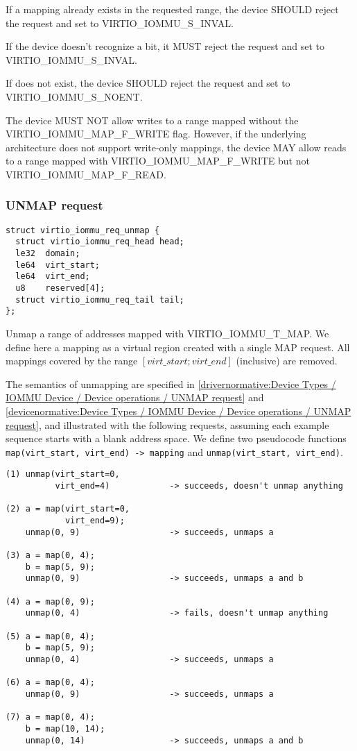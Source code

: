 If a mapping already exists in the requested range, the device SHOULD
reject the request and set  to VIRTIO_IOMMU_S_INVAL.

If the device doesn't recognize a  bit, it MUST reject the
request and set  to VIRTIO_IOMMU_S_INVAL.

If  does not exist, the device SHOULD reject the request and
set  to VIRTIO_IOMMU_S_NOENT.

The device MUST NOT allow writes to a range mapped without the
VIRTIO_IOMMU_MAP_F_WRITE flag. However, if the underlying architecture
does not support write-only mappings, the device MAY allow reads to a
range mapped with VIRTIO_IOMMU_MAP_F_WRITE but not
VIRTIO_IOMMU_MAP_F_READ.

\subsubsection{UNMAP request}\label{sec:Device Types / IOMMU Device / Device operations / UNMAP request}

\begin{lstlisting}
struct virtio_iommu_req_unmap {
  struct virtio_iommu_req_head head;
  le32  domain;
  le64  virt_start;
  le64  virt_end;
  u8    reserved[4];
  struct virtio_iommu_req_tail tail;
};
\end{lstlisting}

Unmap a range of addresses mapped with VIRTIO_IOMMU_T_MAP. We define here
a mapping as a virtual region created with a single MAP request. All
mappings covered by the range $[virt\_start; virt\_end]$ (inclusive) are
removed.

The semantics of unmapping are specified in \ref{drivernormative:Device
Types / IOMMU Device / Device operations / UNMAP request} and
\ref{devicenormative:Device Types / IOMMU Device / Device operations /
UNMAP request}, and illustrated with the following requests, assuming each
example sequence starts with a blank address space. We define two
pseudocode functions \texttt{map(virt_start, virt_end) -> mapping} and
\texttt{unmap(virt_start, virt_end)}.

\begin{lstlisting}
(1) unmap(virt_start=0,
          virt_end=4)            -> succeeds, doesn't unmap anything

(2) a = map(virt_start=0,
            virt_end=9);
    unmap(0, 9)                  -> succeeds, unmaps a

(3) a = map(0, 4);
    b = map(5, 9);
    unmap(0, 9)                  -> succeeds, unmaps a and b

(4) a = map(0, 9);
    unmap(0, 4)                  -> fails, doesn't unmap anything

(5) a = map(0, 4);
    b = map(5, 9);
    unmap(0, 4)                  -> succeeds, unmaps a

(6) a = map(0, 4);
    unmap(0, 9)                  -> succeeds, unmaps a

(7) a = map(0, 4);
    b = map(10, 14);
    unmap(0, 14)                 -> succeeds, unmaps a and b
\end{lstlisting}

